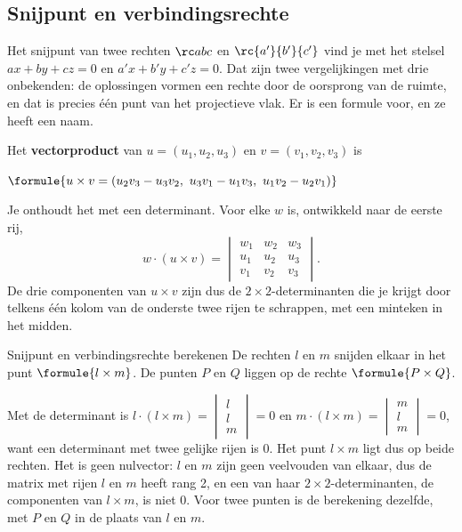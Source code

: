 \subsection{Snijpunt en verbindingsrechte}

Het snijpunt van twee rechten $\rc abc$ en $\rc{a'}{b'}{c'}$ vind je met het stelsel $ax + by + cz = 0$ en $a'x + b'y + c'z = 0$. Dat zijn twee vergelijkingen met drie onbekenden: de oplossingen vormen een rechte door de oorsprong van de ruimte, en dat is precies één punt van het projectieve vlak. Er is een formule voor, en ze heeft een naam.

\begin{theorie}
Het \textbf{\textcolor{accent}{vectorproduct}} van $u = (u_1, u_2, u_3)$ en $v = (v_1, v_2, v_3)$ is

\vspace{1mm}
\qquad $\formule{u \times v = (u_2v_3 - u_3v_2,\ u_3v_1 - u_1v_3,\ u_1v_2 - u_2v_1)}$
\end{theorie}

Je onthoudt het met een determinant. Voor elke $w$ is, ontwikkeld naar de eerste rij,
\[ w \cdot (u \times v) = \begin{vmatrix} w_1 & w_2 & w_3 \\ u_1 & u_2 & u_3 \\ v_1 & v_2 & v_3 \end{vmatrix} . \]
De drie componenten van $u \times v$ zijn dus de $2 \times 2$-determinanten die je krijgt door telkens één kolom van de onderste twee rijen te schrappen, met een minteken in het midden.

\begin{theorie}
\begin{stelling}{Snijpunt en verbindingsrechte berekenen}
De rechten $l$ en $m$ snijden elkaar in het punt $\formule{l \times m}$. De punten $P$ en $Q$ liggen op de rechte $\formule{P \times Q}$.
\end{stelling}

\begin{bewijs}
Met de determinant is $l \cdot (l \times m) = \begin{vmatrix} l \\ l \\ m \end{vmatrix} = 0$ en $m \cdot (l \times m) = \begin{vmatrix} m \\ l \\ m \end{vmatrix} = 0$, want een determinant met twee gelijke rijen is 0. Het punt $l \times m$ ligt dus op beide rechten. Het is geen nulvector: $l$ en $m$ zijn geen veelvouden van elkaar, dus de matrix met rijen $l$ en $m$ heeft rang 2, en een van haar $2 \times 2$-determinanten, de componenten van $l \times m$, is niet 0. Voor twee punten is de berekening dezelfde, met $P$ en $Q$ in de plaats van $l$ en $m$.
\end{bewijs}
\end{theorie}

